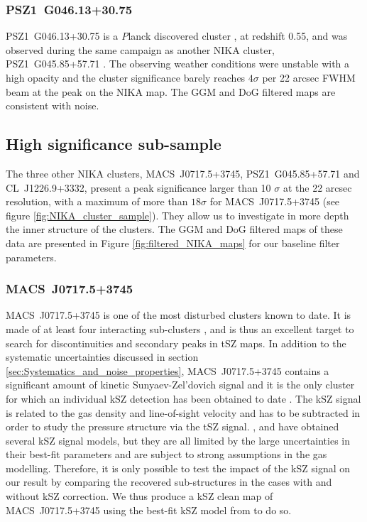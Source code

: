 \documentclass[twocolumn,traditabstract]{aa}
\begin{document}
\subsubsection{PSZ1~G046.13+30.75}
\mbox{PSZ1~G046.13+30.75} is a {\textit Planck} discovered cluster \citep{PlanckXXIX2014}, at redshift 0.55, and was observed during the same campaign as another NIKA cluster, \mbox{PSZ1~G045.85+57.71} \citep[see][for more details]{Ruppin2016}. The observing weather conditions were unstable with a high opacity and the cluster significance barely reaches $4 \sigma$ per 22 arcsec FWHM beam at the peak on the NIKA map. The GGM and DoG filtered maps are consistent with noise.

\subsection{High significance sub-sample}
The three other NIKA clusters, \mbox{MACS~J0717.5+3745}, \mbox{PSZ1~G045.85+57.71} and \mbox{CL~J1226.9+3332}, present a peak significance larger than 10 $\sigma$ at the 22 arcsec resolution, with a maximum of more than $18 \sigma$ for \mbox{MACS~J0717.5+3745} (see figure \ref{fig:NIKA_cluster_sample}). They allow us to investigate in more depth the inner structure of the clusters. The GGM and DoG filtered maps of these data are presented in Figure \ref{fig:filtered_NIKA_maps} for our baseline filter parameters.

\subsubsection{MACS~J0717.5+3745}\label{sec:MACSJ0717}
\mbox{MACS~J0717.5+3745} is one of the most disturbed clusters known to date. It is made of at least four interacting sub-clusters \citep{Ma2009}, and is thus an excellent target to search for discontinuities and secondary peaks in tSZ maps. In addition to the systematic uncertainties discussed in section \ref{sec:Systematics_and_noise_properties}, \mbox{MACS~J0717.5+3745} contains a significant amount of kinetic Sunyaev-Zel'dovich \citep[kSZ,][]{Sunyaev1980} signal and it is the only cluster for which an individual kSZ detection has been obtained to date \citep[][]{Mroczkowski2012,Sayers2013,Adam2016b}. The kSZ signal is related to the gas density and line-of-sight velocity and has to be subtracted in order to study the pressure structure via the tSZ signal. \cite{Mroczkowski2012}, \cite{Sayers2013} and \cite{Adam2016b} have obtained several kSZ signal models, but they are all limited by the large uncertainties in their best-fit parameters and are subject to strong assumptions in the gas modelling. Therefore, it is only possible to test the impact of the kSZ signal on our result by comparing the recovered sub-structures in the cases with and without kSZ correction. We thus produce a kSZ clean map of \mbox{MACS~J0717.5+3745} using the best-fit kSZ model from \cite{Adam2016b} to do so.
\end{document}

